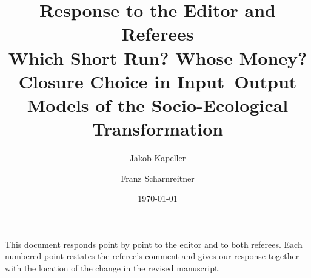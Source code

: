 \documentclass{article}
\title{Response to the Editor and Referees\\[0.3em]
\large Which Short Run? Whose Money? Closure Choice in Input--Output
Models of the Socio-Ecological Transformation}
\author{Jakob Kapeller \and Franz Scharnreitner}
\date{\today}
\begin{document}
\maketitle

\noindent This document responds point by point to the editor and to both
referees. Each numbered point restates the referee's comment and gives our
response together with the location of the change in the revised manuscript.




\end{document}
